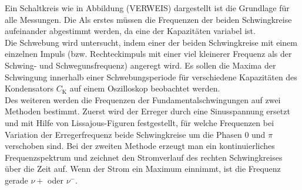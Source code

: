 Ein Schaltkreis wie in Abbildung (VERWEIS) dargestellt ist die Grundlage für alle Messungen. Die Als erstes müssen die Frequenzen der beiden Schwingkreise aufeinander abgestimmt werden, da eine der Kapazitäten variabel ist. \\
Die Schwebung wird untersucht, indem einer der beiden Schwingkreise mit einem einzelnen Impuls (bzw. Rechteckimpuls mit einer viel kleinerer Frequenz als der Schwing- und Schwegunsfrequenz) angeregt wird. Es sollen die Maxima der Schwingung innerhalb einer Schwebungsperiode für verschiedene Kapazitäten des Kondensators $C_\text{K}$ auf einem Oszilloskop beobachtet werden. \\
Des weiteren werden die Frequenzen der Fundamentalschwingungen auf zwei Methoden bestimmt. Zuerst wird der Erreger durch eine Sinusspannung ersetzt und mit Hilfe von Lissajous-Figuren festgestellt, für welche Frequenzen bei Variation der Erregerfrequenz beide Schwingkreise um die Phasen 0 und $\pi$ verschoben sind. Bei der zweiten Methode erzeugt man ein kontinuierliches Frequenzspektrum und zeichnet den Stromverlauf des rechten Schwingkreises über die Zeit auf. Wenn der Strom ein Maximum einnimmt, ist die Frequenz gerade $\nu+$ oder $\nu^-$.
